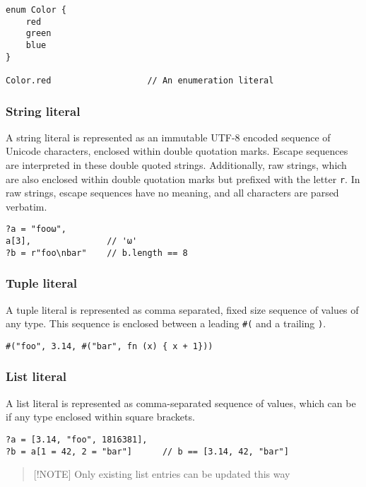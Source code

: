 \begin{verbatim}
enum Color {
    red
    green
    blue
}

Color.red                   // An enumeration literal
\end{verbatim}

\hypertarget{string-literal}{%
\subsubsection{String literal}\label{string-literal}}

A string literal is represented as an immutable UTF-8 encoded sequence
of Unicode characters, enclosed within double quotation marks. Escape
sequences are interpreted in these double quoted strings. Additionally,
raw strings, which are also enclosed within double quotation marks but
prefixed with the letter \texttt{r}. In raw strings, escape sequences
have no meaning, and all characters are parsed verbatim.

\begin{verbatim}
?a = "fooω",
a[3],               // 'ω'
?b = r"foo\nbar"    // b.length == 8
\end{verbatim}

\hypertarget{tuple-literal}{%
\subsubsection{Tuple literal}\label{tuple-literal}}

A tuple literal is represented as comma separated, fixed size sequence
of values of any type. This sequence is enclosed between a leading
\texttt{\#(} and a trailing \texttt{)}.

\texttt{\#("foo",\ 3.14,\ \#("bar",\ fn\ (x)\ \{\ x\ +\ 1\}))}

\hypertarget{list-literal}{%
\subsubsection{List literal}\label{list-literal}}

A list literal is represented as comma-separated sequence of values,
which can be if any type enclosed within square brackets.

\begin{verbatim}
?a = [3.14, "foo", 1816381],
?b = a[1 = 42, 2 = "bar"]      // b == [3.14, 42, "bar"]
\end{verbatim}

\begin{quote}
{[}!NOTE{]} Only existing list entries can be updated this way
\end{quote}

